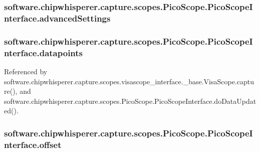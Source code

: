 \subsubsection[{advanced\+Settings}]{\setlength{\rightskip}{0pt plus 5cm}software.\+chipwhisperer.\+capture.\+scopes.\+Pico\+Scope.\+Pico\+Scope\+Interface.\+advanced\+Settings}\label{classsoftware_1_1chipwhisperer_1_1capture_1_1scopes_1_1PicoScope_1_1PicoScopeInterface_a9aebcb97eacec83777d81e6d73f78929}
\hypertarget{classsoftware_1_1chipwhisperer_1_1capture_1_1scopes_1_1PicoScope_1_1PicoScopeInterface_ad9ea43b508d1e01ef4a5be50b086f4e8}{}
\subsubsection[{datapoints}]{\setlength{\rightskip}{0pt plus 5cm}software.\+chipwhisperer.\+capture.\+scopes.\+Pico\+Scope.\+Pico\+Scope\+Interface.\+datapoints}\label{classsoftware_1_1chipwhisperer_1_1capture_1_1scopes_1_1PicoScope_1_1PicoScopeInterface_ad9ea43b508d1e01ef4a5be50b086f4e8}


Referenced by software.\+chipwhisperer.\+capture.\+scopes.\+visascope\+\_\+interface.\+\_\+base.\+Visa\+Scope.\+capture(), and software.\+chipwhisperer.\+capture.\+scopes.\+Pico\+Scope.\+Pico\+Scope\+Interface.\+do\+Data\+Updated().

\hypertarget{classsoftware_1_1chipwhisperer_1_1capture_1_1scopes_1_1PicoScope_1_1PicoScopeInterface_a88fef1117fcd30aadc8ece3e9af43eec}{}
\subsubsection[{offset}]{\setlength{\rightskip}{0pt plus 5cm}software.\+chipwhisperer.\+capture.\+scopes.\+Pico\+Scope.\+Pico\+Scope\+Interface.\+offset}\label{classsoftware_1_1chipwhisperer_1_1capture_1_1scopes_1_1PicoScope_1_1PicoScopeInterface_a88fef1117fcd30aadc8ece3e9af43eec}


